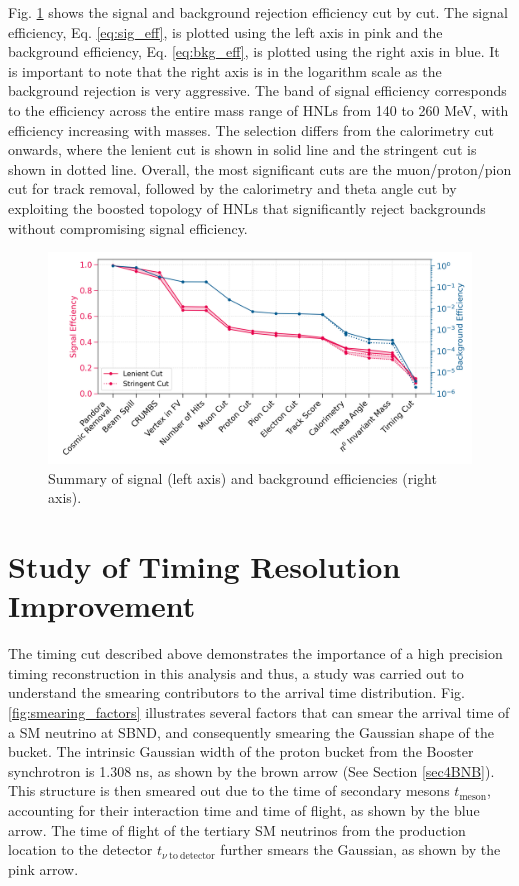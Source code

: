 Fig. \ref{fig:eff} shows the signal and background rejection efficiency cut by cut.
The signal efficiency, Eq. \ref{eq:sig_eff}, is plotted using the left axis in pink and the background efficiency, Eq. \ref{eq:bkg_eff}, is plotted using the right axis in blue.
It is important to note that the right axis is in the logarithm scale as the background rejection is very aggressive.
The band of signal efficiency corresponds to the efficiency across the entire mass range of HNLs from 140 to 260 MeV, with efficiency increasing with masses. 
The selection differs from the calorimetry cut onwards, where the lenient cut is shown in solid line and the stringent cut is shown in dotted line.
Overall, the most significant cuts are the muon/proton/pion cut for track removal, followed by the calorimetry and theta angle cut by exploiting the boosted topology of HNLs that significantly reject backgrounds without compromising signal efficiency.

\begin{figure}[ht!]
    \centering 
    \includegraphics[width=1.0\textwidth]{peff_band}
    \caption[Summary of Selection Efficiency.]{
		Summary of signal (left axis) and background efficiencies (right axis).
	}
        \label{fig:eff}
\end{figure}


\section{Study of Timing Resolution Improvement}
\label{sec:truth_bucket}

The timing cut described above demonstrates the importance of a high precision timing reconstruction in this analysis and thus, a study was carried out to understand the smearing contributors to the arrival time distribution. 
Fig. \ref{fig:smearing_factors} illustrates several factors that can smear the arrival time of a SM neutrino at SBND, and consequently smearing the Gaussian shape of the bucket.
The intrinsic Gaussian width of the proton bucket from the Booster synchrotron is 1.308 ns, as shown by the brown arrow (See Section \ref{sec4BNB}).
This structure is then smeared out due to the time of secondary mesons $t_{\mathrm{meson}}$, accounting for their interaction time and time of flight, as shown by the blue arrow.
The time of flight of the tertiary SM neutrinos from the production location to the detector $t_{\nu\ \mathrm{to\ detector}}$ further smears the Gaussian, as shown by the pink arrow.

